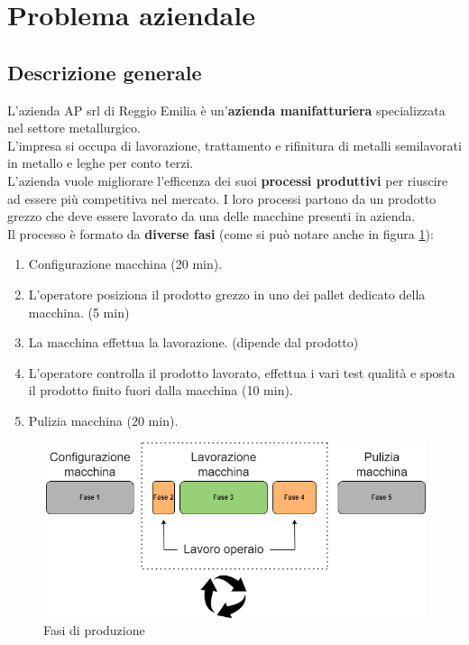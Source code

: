 \section{Problema aziendale}
\subsection{Descrizione generale}
L'azienda AP srl di Reggio Emilia è un'\textbf{azienda manifatturiera} specializzata nel settore metallurgico. \\
L'impresa si occupa di lavorazione, trattamento e rifinitura di metalli semilavorati in metallo e leghe per conto terzi. \\
L'azienda vuole migliorare l'efficenza dei suoi \textbf{processi produttivi} per riuscire ad essere più competitiva nel mercato.
I loro processi partono da un prodotto grezzo che deve essere lavorato da una delle macchine presenti in azienda.\\
Il processo è formato da \textbf{diverse fasi} (come si può notare anche in figura \ref{fig:fasi_di_produzione}):
\begin{enumerate}
    \item Configurazione macchina (20 min).
    \item L'operatore posiziona il prodotto grezzo in uno dei pallet dedicato della macchina. (5 min)
    \item La macchina effettua la lavorazione. (dipende dal prodotto)
    \item L'operatore controlla il prodotto lavorato, effettua i vari test qualità e sposta il prodotto finito fuori dalla macchina (10 min).
    \item Pulizia macchina (20 min).
\end{enumerate}
\begin{figure}[H]
    \centering
    \includegraphics[width=\textwidth]{media/fasi_di_produzione.drawio.png}
    \caption{Fasi di produzione}
    \label{fig:fasi_di_produzione}
\end{figure}
